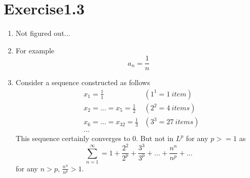 \documentclass[paper=a4, fontsize=11pt]{scrartcl} %
\numberwithin{equation}{section} %
\numberwithin{figure}{section} %
\numberwithin{table}{section} %
\begin{document}
\section{Exercise1.3}
	\begin{enumerate}
		\item 
			Not figured out...
		\item 
			For example
			\begin{equation}
				a_n = \frac{1}{n}
			\end{equation}
		\item 
			Consider a sequence constructed as follows
			\begin{equation}
				\begin{aligned}
					& x_1 = \frac{1}{1} & (1^1=1 \ item)\\
					& x_2 = ... = x_5 = \frac{1}{2} & (2^2=4 \ items)\\
					& x_6 = ... = x_{32} = \frac{1}{3} & (3^3=27 \ items)\\
					& ...
				\end{aligned}
			\end{equation}
			This sequence certainly converges to 0. But not in $L^p$ for any $p>=1$ as
			\begin{equation}
				\sum_{n=1}^{\infty} = 1 + \frac{2^2}{2^p} + \frac{3^3}{3^p} + ... + \frac{n^n}{n^p} + ...
			\end{equation}
			for any $n > p$, $\frac{n^n}{n^p} > 1$.
	\end{enumerate}
\end{document}
